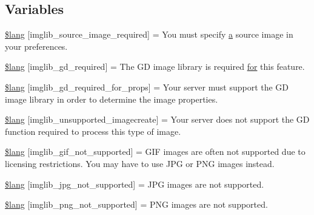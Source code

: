 \subsection*{Variables}
\begin{DoxyCompactItemize}
\item 
\hyperlink{imglib__lang_8php_af48787ab142f633036ebdf1cc5da7409}{\$lang} \mbox{[}\textquotesingle{}imglib\+\_\+source\+\_\+image\+\_\+required\textquotesingle{}\mbox{]} = \textquotesingle{}You must specify \hyperlink{bootstrap_8min_8js_a1f5870dcf487187f13d5fd328ed9e6e7}{a} source image in your preferences.\textquotesingle{}
\item 
\hyperlink{imglib__lang_8php_aa8d7f8276e62fbe759daef2021c16552}{\$lang} \mbox{[}\textquotesingle{}imglib\+\_\+gd\+\_\+required\textquotesingle{}\mbox{]} = \textquotesingle{}The G\+D image library is required \hyperlink{confirm__transfer_8php_aaf007b9fa5c90d7c5a7011bece9cfc15}{for} this feature.\textquotesingle{}
\item 
\hyperlink{imglib__lang_8php_a0da9c99f9e2b5f38ccbefb9d9f702c5e}{\$lang} \mbox{[}\textquotesingle{}imglib\+\_\+gd\+\_\+required\+\_\+for\+\_\+props\textquotesingle{}\mbox{]} = \textquotesingle{}Your server must support the G\+D image library in order to determine the image properties.\textquotesingle{}
\item 
\hyperlink{imglib__lang_8php_ace032cbe8dafb1f3417a758d0914ecdb}{\$lang} \mbox{[}\textquotesingle{}imglib\+\_\+unsupported\+\_\+imagecreate\textquotesingle{}\mbox{]} = \textquotesingle{}Your server does not support the G\+D function required to process this type of image.\textquotesingle{}
\item 
\hyperlink{imglib__lang_8php_a235a59a6660145fc136b3933b5b10675}{\$lang} \mbox{[}\textquotesingle{}imglib\+\_\+gif\+\_\+not\+\_\+supported\textquotesingle{}\mbox{]} = \textquotesingle{}G\+I\+F images are often not supported due to licensing restrictions. You may have to use J\+P\+G or P\+N\+G images instead.\textquotesingle{}
\item 
\hyperlink{imglib__lang_8php_a4acdc927c172bab1370b2897c667c552}{\$lang} \mbox{[}\textquotesingle{}imglib\+\_\+jpg\+\_\+not\+\_\+supported\textquotesingle{}\mbox{]} = \textquotesingle{}J\+P\+G images are not supported.\textquotesingle{}
\item 
\hyperlink{imglib__lang_8php_a0b7ea2e2fbd03eb72fe9d969adb643dd}{\$lang} \mbox{[}\textquotesingle{}imglib\+\_\+png\+\_\+not\+\_\+supported\textquotesingle{}\mbox{]} = \textquotesingle{}P\+N\+G images are not supported.\textquotesingle{}

\end{DoxyCompactItemize}
